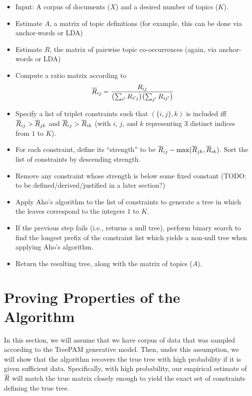 \documentclass{article}
\theoremstyle{definition}
\begin{document}
\begin{itemize}
  \item Input: A corpus of documents ($X$) and a desired number of topics ($K$).
  \item Estimate $A$, a matrix of topic definitions (for example, this can be done via anchor-words or LDA)
  \item Estimate $R$, the matrix of pairwise topic co-occurrences (again, via anchor-words or LDA)
  \item Compute a ratio matrix according to
  \begin{align}
  \overline{R}_{ij} = \frac{R_{ij}}{ \bigl( \sum_{i'} R_{i'j} \bigr) \bigl( \sum_{j'} R_{ij'} \bigr) }
  \end{align}
  \item Specify a list of triplet constraints such that $(\{i, j\}, k)$ is included iff $\overline{R}_{ij} > \overline{R}_{jk}$ and $\overline{R}_{ij} > \overline{R}_{ik}$ (with $i$, $j$, and $k$ representing 3 distinct indices from $1$ to $K$).
  \item For each constraint, define its ``strength'' to be $\overline{R}_{ij} - \max(\overline{R}_{jk}, \overline{R}_{ik})$.
        Sort the list of constraints by descending strength.
  \item Remove any constraint whose strength is below some fixed constant (TODO: to be defined/derived/justified in a later section?)
  \item Apply Aho's algorithm to the list of constraints to generate a tree in which the leaves correspond to the integers $1$ to $K$.
  \item If the previous step fails (i.e., returns a null tree), perform binary search to find the longest prefix of the constraint list which yields a non-null tree when applying Aho's algorithm.
  \item Return the resulting tree, along with the matrix of topics ($A$).
\end{itemize}


\section{Proving Properties of the Algorithm}

In this section, we will assume that we have corpus of data that was sampled according to the TreePAM generative model.
Then, under this assumption, we will show that the algorithm recovers the true tree with high probability if it is given sufficient data.
Specifically, with high probability, our empirical estimate of $\overline{R}$ will match the true matrix closely enough to yield the exact set of constraints defining the true tree.
\end{document}
